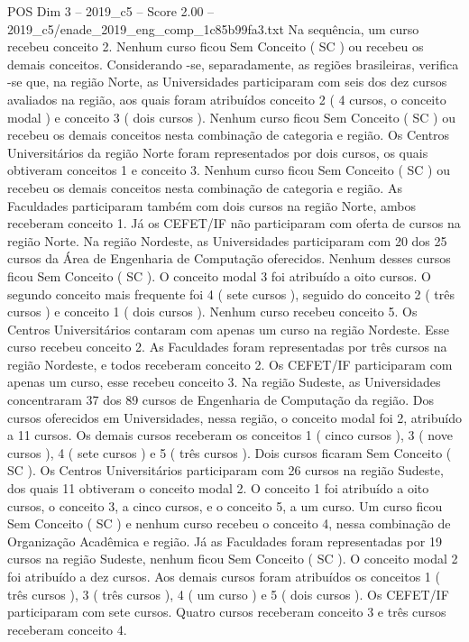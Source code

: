 \begin{textsample}{POS Dim 3 – 2019\_c5 – Score 2.00 – 2019\_c5/enade\_2019\_eng\_comp\_1c85b99fa3.txt}
Na sequência, um curso recebeu conceito 2.
Nenhum curso ficou Sem Conceito ( SC ) ou recebeu os demais conceitos.
Considerando -se, separadamente, as regiões brasileiras, verifica -se que, na região Norte, as Universidades participaram com seis dos dez cursos avaliados na região, aos quais foram atribuídos conceito 2 ( 4 cursos, o conceito modal ) e conceito 3 ( dois cursos ).
Nenhum curso ficou Sem Conceito ( SC ) ou recebeu os demais conceitos nesta combinação de categoria e região.
Os Centros Universitários da região Norte foram representados por dois cursos, os quais obtiveram conceitos 1 e conceito 3.
Nenhum curso ficou Sem Conceito ( SC ) ou recebeu os demais conceitos nesta combinação de categoria e região.
As Faculdades participaram também com dois cursos na região Norte, ambos receberam conceito 1.
Já os CEFET/IF não participaram com oferta de cursos na região Norte.
Na região Nordeste, as Universidades participaram com 20 dos 25 cursos da Área de Engenharia de Computação oferecidos.
Nenhum desses cursos ficou Sem Conceito ( SC ).
O conceito modal 3 foi atribuído a oito cursos.
O segundo conceito mais frequente foi 4 ( sete cursos ), seguido do conceito 2 ( três cursos ) e conceito 1 ( dois cursos ).
Nenhum curso recebeu conceito 5.
Os Centros Universitários contaram com apenas um curso na região Nordeste.
Esse curso recebeu conceito 2.
As Faculdades foram representadas por três cursos na região Nordeste, e todos receberam conceito 2.
Os CEFET/IF participaram com apenas um curso, esse recebeu conceito 3.
Na região Sudeste, as Universidades concentraram 37 dos 89 cursos de Engenharia de Computação da região.
Dos cursos oferecidos em Universidades, nessa região, o conceito modal foi 2, atribuído a 11 cursos.
Os demais cursos receberam os conceitos 1 ( cinco cursos ), 3 ( nove cursos ), 4 ( sete cursos ) e 5 ( três cursos ).
Dois cursos ficaram Sem Conceito ( SC ).
Os Centros Universitários participaram com 26 cursos na região Sudeste, dos quais 11 obtiveram o conceito modal 2.
O conceito 1 foi atribuído a oito cursos, o conceito 3, a cinco cursos, e o conceito 5, a um curso.
Um curso ficou Sem Conceito ( SC ) e nenhum curso recebeu o conceito 4, nessa combinação de Organização Acadêmica e região.
Já as Faculdades foram representadas por 19 cursos na região Sudeste, nenhum ficou Sem Conceito ( SC ).
O conceito modal 2 foi atribuído a dez cursos.
Aos demais cursos foram atribuídos os conceitos 1 ( três cursos ), 3 ( três cursos ), 4 ( um curso ) e 5 ( dois cursos ).
Os CEFET/IF participaram com sete cursos.
Quatro cursos receberam conceito 3 e três cursos receberam conceito 4.

\end{textsample}
